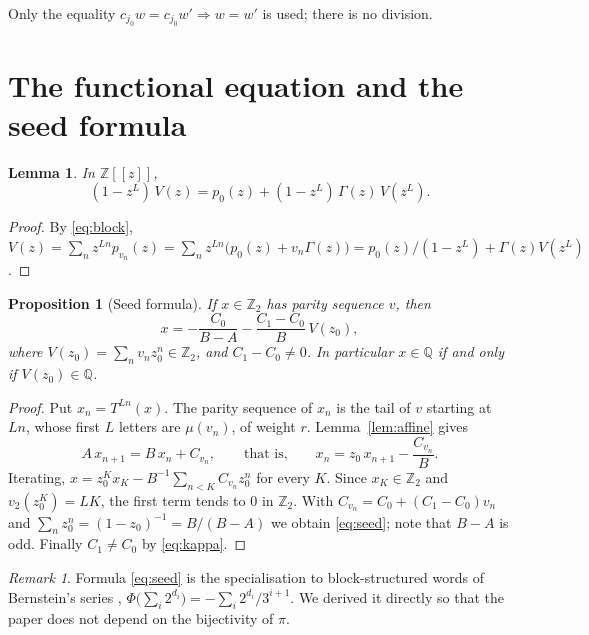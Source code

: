 \documentclass[11pt,reqno]{amsart}
\newtheorem{proposition}[theorem]{Proposition}
\newtheorem{lemma}[theorem]{Lemma}
\theoremstyle{definition}
\theoremstyle{remark}
\newtheorem{remark}[theorem]{Remark}
\newcommand{\Z}{\mathbb{Z}}
\newcommand{\Q}{\mathbb{Q}}
\newcommand{\Zt}{\mathbb{Z}_2}
\newcommand{\vt}{v_2}
\begin{document}
Only the equality $c_{j_0}w=c_{j_0}w'\Rightarrow w=w'$ is used; there is no
division.

\section{The functional equation and the seed formula}\label{sec:seed}

\begin{lemma}\label{lem:mahler}
In $\Z[[z]]$,
\begin{equation}\label{eq:mahler}
  (1-z^{L})\,V(z)=p_0(z)+(1-z^{L})\,\Gamma(z)\,V(z^{L}).
\end{equation}
\end{lemma}

\begin{proof}
By \eqref{eq:block},
$V(z)=\sum_{n}z^{Ln}p_{v_n}(z)=\sum_nz^{Ln}\bigl(p_0(z)+v_n\Gamma(z)\bigr)
=p_0(z)/(1-z^{L})+\Gamma(z)V(z^{L})$.
\end{proof}

\begin{proposition}[Seed formula]\label{prop:seed}
If $x\in\Zt$ has parity sequence $v$, then
\begin{equation}\label{eq:seed}
  x=-\frac{C_0}{B-A}-\frac{C_1-C_0}{B}\,V(z_0),
\end{equation}
where $V(z_0)=\sum_nv_nz_0^{n}\in\Zt$, and $C_1-C_0\ne 0$.  In particular
$x\in\Q$ if and only if $V(z_0)\in\Q$.
\end{proposition}

\begin{proof}
Put $x_n=T^{Ln}(x)$.  The parity sequence of $x_n$ is the tail of $v$
starting at $Ln$, whose first $L$ letters are $\mu(v_n)$, of weight $r$.
Lemma~\ref{lem:affine} gives
\begin{equation}\label{eq:blockrec}
  A\,x_{n+1}=B\,x_n+C_{v_n},\qquad\text{that is,}\qquad
  x_n=z_0\,x_{n+1}-\frac{C_{v_n}}{B}.
\end{equation}
Iterating, $x=z_0^{K}x_K-B^{-1}\sum_{n<K}C_{v_n}z_0^{n}$ for every $K$.
Since $x_K\in\Zt$ and $\vt(z_0^{K})=LK$, the first term tends to $0$ in
$\Zt$.  With $C_{v_n}=C_0+(C_1-C_0)v_n$ and
$\sum_nz_0^{n}=(1-z_0)^{-1}=B/(B-A)$ we obtain \eqref{eq:seed}; note that
$B-A$ is odd.  Finally $C_1\ne C_0$ by \eqref{eq:kappa}.
\end{proof}

\begin{remark}
Formula \eqref{eq:seed} is the specialisation to block-structured words of
Bernstein's series \cite{Bernstein1994}, \cite[(1.6)]{BernsteinLagarias1996}
$\Phi\bigl(\sum_i2^{d_i}\bigr)=-\sum_i2^{d_i}/3^{i+1}$.  We derived it
directly so that the paper does not depend on the bijectivity of $\pi$.
\end{remark}
\end{document}
